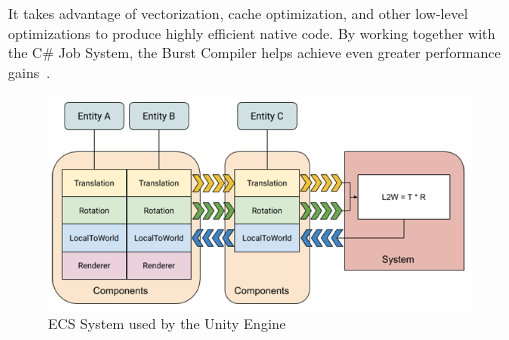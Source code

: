 It takes advantage of vectorization, cache optimization, and other low-level optimizations to produce highly efficient native code.
By working together with the C\# Job System, the Burst Compiler helps achieve even greater performance gains~\cite{dots}.
\begin{figure}
    \centering
    \includegraphics[width=\textwidth]{Pictures/res/fundamentals/ECSBlockDiagram-unity}
    \caption{ECS System used by the Unity Engine~\cite{unity-ecs}}
    \label{fig:ecs-unity}
\end{figure}
